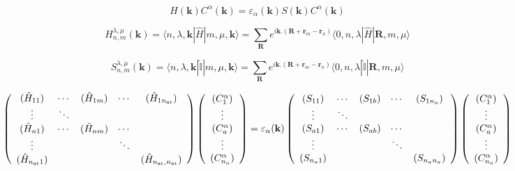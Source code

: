 \documentclass{article}
\newcommand{\bra}[1]{\langle #1|}
\newcommand{\ket}[1]{|#1\rangle}
\newcommand{\op}[1]{\hat{#1}}
\begin{document}
\[\displaystyle  H(\mathbf{k})C^{\alpha}(\mathbf{k})= \varepsilon_{\alpha}(\mathbf{k})     S(\mathbf{k})C^{\alpha}(\mathbf{k})\]


\noindent
\[\displaystyle H_{n,m}^{\lambda,\mu}(\mathbf{k})=\bra{ n,\lambda,\mathbf{k}} \op{H}\ket{ m,\mu,\mathbf{k}}=
\sum_{\mathbf{R}} e^{i\mathbf{k}.(\mathbf{R}+\mathbf{r}_{m}-\mathbf{r}_n)} \bra{ 0,n,\lambda} \op{H} \ket{\mathbf{R},m,\mu}\]


\[\displaystyle  S_{n,m}^{\lambda,\mu}(\mathbf{k})=\bra{n,\lambda,\mathbf{k}}\op{\mathbb{I}}\ket{ m,\mu,\mathbf{k}}=
\sum_{\mathbf{R}} e^{i\mathbf{k}.(\mathbf{R}+\mathbf{r}_{m}-\mathbf{r}_n)}
\bra{ 0,n,\lambda}\op{\mathbb{I}}\ket{\mathbf{R},m,\mu }\]

\noindent
\[ \left( \begin{array}{c c c c c}
(\hat{H}_{1 1}) & \cdots & (\hat{H}_{1 m}) & \cdots & (\hat{H}_{1 n_{\text{at}}}) \\
\vdots & \ddots & & & \\
(\hat{H}_{n 1}) & \cdots & (\hat{H}_{n m}) & \cdots & \\
\vdots & & & \ddots & \\
(\hat{H}_{n_{\text{at}} 1}) & & & & (\hat{H}_{n_{\text{at}}, n_{\text{at}}})
\end{array} \right )
\left( \begin{array}{c}
(C_1^{\alpha}) \\
\vdots \\
(C_{a}^{\alpha}) \\
\vdots \\
(C_{n_a}^{\alpha})
\end{array} \right )= \varepsilon_{\alpha}(\mathbf{k})
\left( \begin{array}{c c c c c}
(S_{1 1}) & \cdots & (S_{1 b}) & \cdots & (S_{1 n_a}) \\
\vdots & \ddots & & & \\
(S_{a 1}) & \cdots & (S_{a b}) & \cdots & \\
\vdots & & & \ddots & \\
(S_{n_a 1 }) & & & & (S_{n_a n_a})
\end{array} \right )
\left( \begin{array}{c}
(C_1^{\alpha}) \\
\vdots \\
(C_{a}^{\alpha}) \\
\vdots \\
(C_{n_a}^{\alpha})
\end{array} \right )
\]
\end{document}
